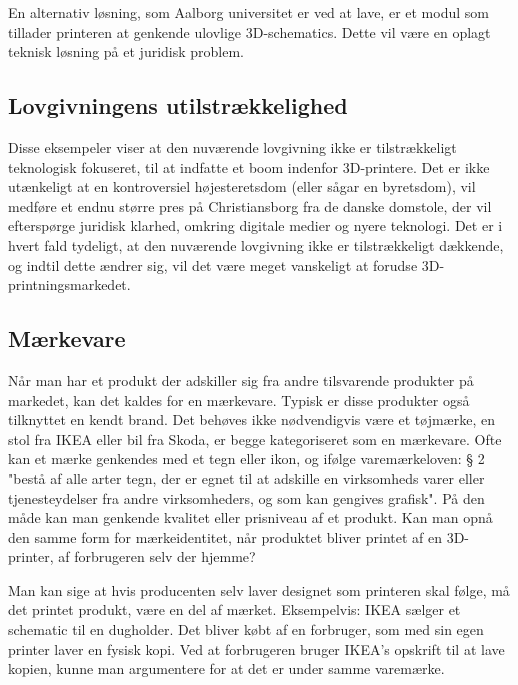 En alternativ løsning, som Aalborg universitet er ved at lave, er et modul som tillader printeren at genkende ulovlige 3D-schematics. Dette vil være en oplagt teknisk løsning på et juridisk problem.

\subsection{Lovgivningens utilstrækkelighed}
 
Disse eksempeler viser at den nuværende lovgivning ikke er tilstrækkeligt teknologisk fokuseret, til at indfatte et boom indenfor 3D-printere. Det er ikke utænkeligt at en kontroversiel højesteretsdom (eller sågar en byretsdom), vil medføre et endnu større pres på Christiansborg fra de danske domstole, der vil efterspørge juridisk klarhed, omkring digitale medier og nyere teknologi.
Det er i hvert fald tydeligt, at den nuværende lovgivning ikke er tilstrækkeligt dækkende, og indtil dette ændrer sig, vil det være meget vanskeligt at forudse 3D-printningsmarkedet.

\subsection{Mærkevare}

Når man har et produkt der adskiller sig fra andre tilsvarende produkter på markedet, kan det kaldes for en mærkevare. Typisk er disse produkter også tilknyttet en kendt brand.
Det behøves ikke nødvendigvis være et tøjmærke, en stol fra IKEA eller bil fra Skoda, er begge kategoriseret som en mærkevare. 
Ofte kan et mærke genkendes med et tegn eller ikon, og ifølge varemærkeloven: § 2 "bestå af alle arter tegn, der er egnet til at adskille en virksomheds varer eller tjenesteydelser fra andre virksomheders, og som kan gengives grafisk". På den måde kan man genkende kvalitet eller prisniveau af et produkt.
Kan man opnå den samme form for mærkeidentitet, når produktet bliver printet af en 3D-printer, af forbrugeren selv der hjemme?

Man kan sige at hvis producenten selv laver designet som printeren skal følge, må det printet produkt, være en del af mærket. Eksempelvis: IKEA sælger et schematic til en dugholder. Det bliver købt af en forbruger, som med sin egen printer laver en fysisk kopi. Ved at forbrugeren bruger IKEA’s opskrift til at lave kopien, kunne man argumentere for at det er under samme varemærke. 

